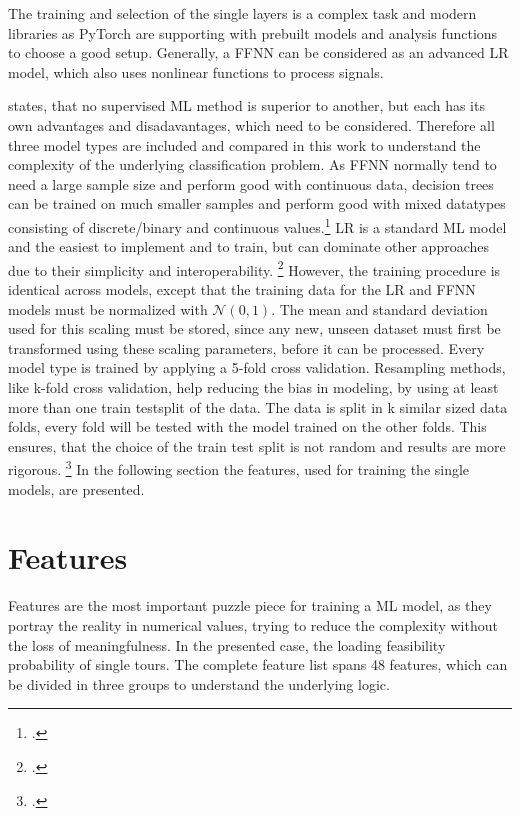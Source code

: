 

The training and selection of the single layers is a complex task
and modern libraries as PyTorch are supporting with prebuilt models and analysis functions to choose
a good setup. Generally, a \gls{FFNN} can be considered as an advanced \gls{LR} model,
which also uses nonlinear functions to process signals.

\parbreak
\cite{kotsiantis_supervised_2007} states, that no supervised \gls{ML} method is superior to another,
but each has its own advantages and disadavantages, which need to be considered.
Therefore all three model types are included and compared in this work
to understand the complexity of the underlying classification problem. As \gls{FFNN} normally
tend to need a large sample size and perform good with continuous data, decision trees can be
trained on much smaller samples and perform good with mixed datatypes consisting of discrete/binary
and continuous values.\footcite[cf.][pp. 262ff.]{kotsiantis_supervised_2007}
\gls{LR} is a standard \gls{ML} model and the easiest to implement and to train, but can dominate
other approaches due to their simplicity and interoperability. \footcite[cf.][p.8]{kirasich_random_2018}
However, the training procedure is identical across models, except that the training data for the \gls{LR} and \gls{FFNN}
models must be normalized with $\mathcal{N}(0,1)$. The mean and standard deviation used
for this scaling must be stored, since any new, unseen dataset must first be transformed
using these scaling parameters, before it can be processed. Every model type is trained by applying a 5-fold cross validation.
Resampling methods, like k-fold cross validation, help reducing the bias in modeling, by using at least more than one train testsplit of the data.
The data is split in k similar sized data folds, every fold will be tested with the model trained on the other folds.
This ensures, that the choice of the train test split is not random and results are more rigorous. \footcite[cf.][pp.69-72]{kuhn_applied_2016}
In the following section the features, used for training the single models, are presented.


\section{Features}
\label{sec:Features}

Features are the most important puzzle piece for training a \gls{ML} model, as they portray the reality in numerical values, trying to
reduce the complexity without the loss of meaningfulness. In the presented case, the loading feasibility probability of single tours.
The complete feature list spans 48 features, which can be divided in three groups to understand the underlying logic.

